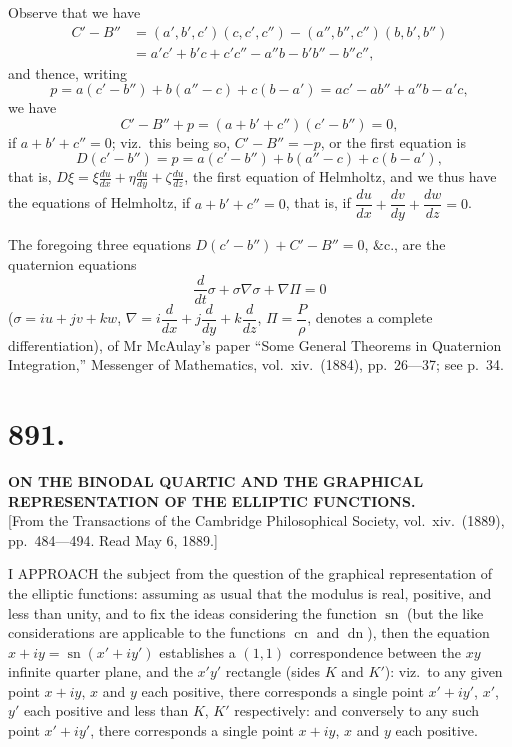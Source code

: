 \documentclass[11pt,a4paper]{article}
\DeclareMathOperator{\sn}{sn}
\DeclareMathOperator{\cn}{cn}
\DeclareMathOperator{\dn}{dn}
\begin{document}
Observe that we have
\begin{align*}
C' - B'' &= (a', b', c')(c, c', c'') - (a'', b'', c'')(b, b', b'') \\
&= a'c' + b'c + c'c'' - a''b - b'b'' - b''c'',
\end{align*}
and thence, writing
\[
p = a(c' - b'') + b(a'' - c) + c(b - a') = ac' - ab'' + a''b - a'c,
\]
we have
\[
C' - B'' + p = (a + b' + c'')(c' - b'') = 0,
\]
if $a + b' + c'' = 0$; viz.\ this being so, $C' - B'' = -p$, or the first equation is
\[
D(c' - b'') = p = a(c' - b'') + b(a'' - c) + c(b - a'),
\]
that is, $\displaystyle D\xi = \xi\frac{du}{dx} + \eta\frac{du}{dy} + \zeta\frac{du}{dz}$, the first equation of Helmholtz, and we thus have the equations of Helmholtz, if $a + b' + c'' = 0$, that is, if $\dfrac{du}{dx} + \dfrac{dv}{dy} + \dfrac{dw}{dz} = 0$.

The foregoing three equations $D(c' - b'') + C' - B'' = 0$, \&c., are the quaternion equations
\[
\frac{d}{dt}\sigma + \sigma\nabla \sigma + \nabla\Pi = 0
\]
($\sigma = iu + jv + kw$, $\nabla = i\dfrac{d}{dx} + j\dfrac{d}{dy} + k\dfrac{d}{dz}$, $\Pi = \dfrac{P}{\rho}$, denotes a complete differentiation), of Mr McAulay's paper ``Some General Theorems in Quaternion Integration,'' Messenger of Mathematics, vol.\ xiv.\ (1884), pp.\ 26---37; see p.\ 34.


\section*{891.}
\begin{center}
{\large\bfseries ON THE BINODAL QUARTIC AND THE GRAPHICAL REPRESENTATION OF THE ELLIPTIC FUNCTIONS.}\\[0.5em]
\small [From the Transactions of the Cambridge Philosophical Society, vol.\ xiv.\ (1889), pp.\ 484---494. Read May 6, 1889.]
\end{center}

I APPROACH the subject from the question of the graphical representation of the elliptic functions: assuming as usual that the modulus is real, positive, and less than unity, and to fix the ideas considering the function $\sn$ (but the like considerations are applicable to the functions $\cn$ and $\dn$), then the equation $x + iy = \sn(x' + iy')$ establishes a $(1, 1)$ correspondence between the $xy$ infinite quarter plane, and the $x'y'$ rectangle (sides $K$ and $K'$): viz.\ to any given point $x + iy$, $x$ and $y$ each positive, there corresponds a single point $x' + iy'$, $x'$, $y'$ each positive and less than $K$, $K'$ respectively: and conversely to any such point $x' + iy'$, there corresponds a single point $x + iy$, $x$ and $y$ each positive.
\end{document}
